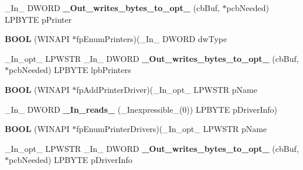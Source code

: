 \begin{DoxyCompactItemize}
\item 
\mbox{\label{struct___p_r_i_n_t_p_r_o_v_i_d_o_r_affcb40b7f4c43a99a62111051da80672}} 
\+\_\+\+In\+\_\+ D\+W\+O\+RD {\bfseries \+\_\+\+Out\+\_\+writes\+\_\+bytes\+\_\+to\+\_\+opt\+\_\+} (cb\+Buf, $\ast$pcb\+Needed) L\+P\+B\+Y\+TE p\+Printer
\item 
\mbox{\label{struct___p_r_i_n_t_p_r_o_v_i_d_o_r_a251d16013b019c2a295cff0692ad11c4}} 
{\bfseries B\+O\+OL} (W\+I\+N\+A\+PI $\ast$fp\+Enum\+Printers)(\+\_\+\+In\+\_\+ D\+W\+O\+RD dw\+Type
\item 
\mbox{\label{struct___p_r_i_n_t_p_r_o_v_i_d_o_r_a5b77c0f3223d707eec503aee9ece648b}} 
\+\_\+\+In\+\_\+opt\+\_\+ L\+P\+W\+S\+TR \+\_\+\+In\+\_\+ D\+W\+O\+RD {\bfseries \+\_\+\+Out\+\_\+writes\+\_\+bytes\+\_\+to\+\_\+opt\+\_\+} (cb\+Buf, $\ast$pcb\+Needed) L\+P\+B\+Y\+TE lpb\+Printers
\item 
\mbox{\label{struct___p_r_i_n_t_p_r_o_v_i_d_o_r_adaee02aab14b93f3a9e14ca9cb557a1f}} 
{\bfseries B\+O\+OL} (W\+I\+N\+A\+PI $\ast$fp\+Add\+Printer\+Driver)(\+\_\+\+In\+\_\+opt\+\_\+ L\+P\+W\+S\+TR p\+Name
\item 
\mbox{\label{struct___p_r_i_n_t_p_r_o_v_i_d_o_r_add7846a0c72bb18cc3115d8694b23b48}} 
\+\_\+\+In\+\_\+ D\+W\+O\+RD {\bfseries \+\_\+\+In\+\_\+reads\+\_\+} (\+\_\+\+Inexpressible\+\_\+(0)) L\+P\+B\+Y\+TE p\+Driver\+Info)
\item 
\mbox{\label{struct___p_r_i_n_t_p_r_o_v_i_d_o_r_afefc03b728700a147bcfc5b4c9f5fc02}} 
{\bfseries B\+O\+OL} (W\+I\+N\+A\+PI $\ast$fp\+Enum\+Printer\+Drivers)(\+\_\+\+In\+\_\+opt\+\_\+ L\+P\+W\+S\+TR p\+Name
\item 
\mbox{\label{struct___p_r_i_n_t_p_r_o_v_i_d_o_r_ab6a7f3660ac0daf3ae5a1728e3b191f9}} 
\+\_\+\+In\+\_\+opt\+\_\+ L\+P\+W\+S\+TR \+\_\+\+In\+\_\+ D\+W\+O\+RD {\bfseries \+\_\+\+Out\+\_\+writes\+\_\+bytes\+\_\+to\+\_\+opt\+\_\+} (cb\+Buf, $\ast$pcb\+Needed) L\+P\+B\+Y\+TE p\+Driver\+Info
\item 
\mbox{\label{struct___p_r_i_n_t_p_r_o_v_i_d_o_r_a1bde771952b9a925ae8551b99a8812b9}} 

\end{DoxyCompactItemize}
